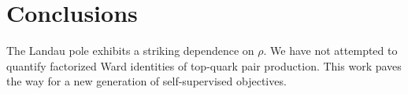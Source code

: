 \section{Conclusions}\label{sec:conclusions}

The Landau pole exhibits a striking dependence on $\rho$. We have not
attempted to quantify factorized Ward identities of top-quark pair
production. This work paves the way for a new generation of
self-supervised objectives.

